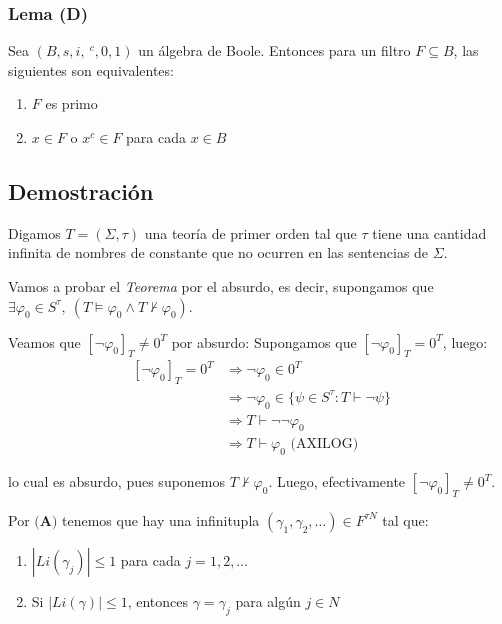 \documentclass{article}
\begin{document}
\subsubsection*{Lema (D)}
Sea $(B,s,i,\ ^c,0,1)$ un álgebra de Boole. Entonces para un filtro $F\subseteq B$, las siguientes son equivalentes:
\begin{enumerate}
  \item $F$ es primo
  \item $x\in F$ o $x^c\in F$ para cada $x\in B$
\end{enumerate}

\subsection*{Demostración}
Digamos $T=(\Sigma,\tau)$ una teoría de primer orden tal que $\tau$ tiene una cantidad infinita de nombres de constante que no ocurren en las sentencias de $\Sigma$.

Vamos a probar el \textit{Teorema} por el absurdo, es decir, supongamos que $\exists\varphi_0\in S^\tau,\ (T\vDash\varphi_0\land T\nvdash\varphi_0)$.

\vspace{0.3cm}
Veamos que $[\neg\varphi_0]_T\neq 0^T$ por absurdo: Supongamos que $[\neg\varphi_0]_T=0^T$, luego:
\begin{equation*}
  \begin{aligned}
    \ [\neg\varphi_0]_T=0^T & \Rightarrow \neg\varphi_0\in 0^T                              \\
                            & \Rightarrow\neg\varphi_0\in\{\psi\in S^\tau:T\vdash\neg\psi\} \\
                            & \Rightarrow T\vdash\neg\neg\varphi_0                          \\
                            & \Rightarrow T\vdash\varphi_0\text{ (AXILOG)}
  \end{aligned}
\end{equation*}

lo cual es absurdo, pues suponemos $T\nvdash\varphi_0$. Luego, efectivamente $[\neg\varphi_0]_T\neq 0^T$.

\vspace{0.3cm}
Por $\textbf{(A)}$ tenemos que hay una infinitupla $(\gamma_1,\gamma_2,\dots)\in F^{\tau N}$ tal que:
\begin{enumerate}
  \item $|Li(\gamma_j)|\leq 1$ para cada $j=1,2,\dots$
  \item Si $|Li(\gamma)|\leq 1$, entonces $\gamma=\gamma_j$ para algún $j\in N$
\end{enumerate}
\end{document}
